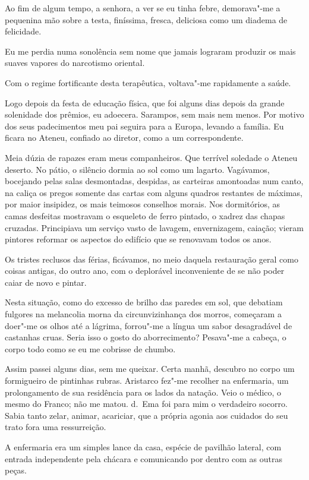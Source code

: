 Ao fim de algum tempo, a senhora, a ver se eu tinha febre, demorava"-me
a pequenina mão sobre a testa, finíssima, fresca, deliciosa como um
diadema de felicidade. 

Eu me perdia numa sonolência sem nome que jamais
lograram produzir os mais suaves vapores do narcotismo oriental. 

Com o regime fortificante desta terapêutica, voltava"-me rapidamente a
saúde. 

Logo depois da festa de educação física, que foi alguns dias
depois da grande solenidade dos prêmios, eu adoecera. Sarampos, sem
mais nem menos. Por motivo dos seus padecimentos meu pai seguira para a
Europa, levando a família. Eu ficara no Ateneu, confiado ao diretor,
como a um correspondente. 

Meia dúzia de rapazes eram meus companheiros.
Que terrível soledade o Ateneu deserto. No pátio, o silêncio dormia ao
sol como um lagarto. Vagávamos, bocejando pelas salas desmontadas,
despidas, as carteiras amontoadas num canto, na caliça os pregos
somente das cartas com alguns quadros restantes de máximas, por maior
insipidez, os mais teimosos conselhos morais. Nos dormitórios, as camas
desfeitas mostravam o esqueleto de ferro pintado, o xadrez das chapas
cruzadas. Principiava um serviço vasto de lavagem, envernizagem,
caiação; vieram pintores reformar os aspectos do edifício que se
renovavam todos os anos. 

Os tristes reclusos das férias, ficávamos, no
meio daquela restauração geral como coisas antigas, do outro ano, com o
deplorável inconveniente de se não poder caiar de novo e pintar. 

Nesta situação, como do excesso de brilho das paredes em sol, que debatiam
fulgores na melancolia morna da circunvizinhança dos morros, começaram
a doer"-me os olhos até a lágrima, forrou"-me a língua um sabor
desagradável de castanhas cruas. Seria isso o gosto do aborrecimento?
Pesava"-me a cabeça, o corpo todo como se eu me cobrisse de chumbo.

Assim passei alguns dias, sem me queixar. Certa manhã, descubro no
corpo um formigueiro de pintinhas rubras. Aristarco fez"-me recolher
na enfermaria, um prolongamento de sua residência para os lados da
natação. Veio o médico, o mesmo do Franco; não me matou. d.~Ema foi
para mim o verdadeiro socorro. Sabia tanto zelar, animar, acariciar,
que a própria agonia aos cuidados do seu trato fora uma ressurreição. 

A enfermaria era um simples lance da casa, espécie de pavilhão lateral,
com entrada independente pela chácara e comunicando por dentro com as
outras peças. 

